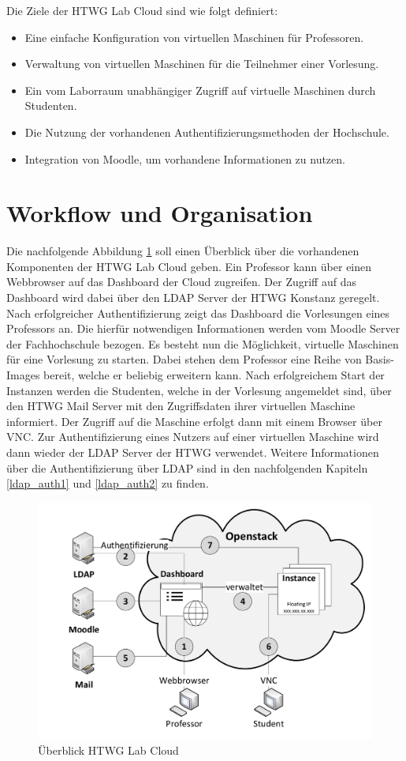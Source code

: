 Die Ziele der HTWG Lab Cloud sind wie folgt definiert:
\begin{itemize}
\item Eine einfache Konfiguration von virtuellen Maschinen für Professoren.
\item Verwaltung von virtuellen Maschinen für die Teilnehmer einer Vorlesung.
\item Ein vom Laborraum unabhängiger Zugriff auf virtuelle Maschinen durch Studenten.
\item Die Nutzung der vorhandenen Authentifizierungsmethoden der Hochschule.
\item Integration von Moodle, um vorhandene Informationen zu nutzen.
\end{itemize}

\section{Workflow und Organisation}
Die nachfolgende Abbildung \ref{overview} soll einen Überblick über 
die vorhandenen Komponenten der HTWG Lab Cloud geben.
Ein Professor kann über einen
Webbrowser auf das Dashboard der Cloud zugreifen. Der Zugriff auf das Dashboard wird dabei
über den LDAP Server der HTWG Konstanz geregelt. Nach erfolgreicher Authentifizierung 
zeigt das Dashboard die Vorlesungen eines Professors an. Die hierfür notwendigen Informationen
werden vom Moodle Server der Fachhochschule bezogen. 
Es besteht nun die Möglichkeit, virtuelle Maschinen für eine Vorlesung zu starten.
Dabei stehen dem Professor eine Reihe von Basis-Images bereit, welche er beliebig erweitern kann.
Nach erfolgreichem Start der Instanzen werden die
Studenten, welche in der Vorlesung angemeldet sind, über den HTWG Mail Server mit den
Zugriffsdaten ihrer virtuellen Maschine informiert. Der Zugriff auf die Maschine erfolgt dann mit
einem Browser über VNC. Zur Authentifizierung eines Nutzers auf einer virtuellen Maschine wird
dann wieder der LDAP Server der HTWG verwendet.
Weitere Informationen über die Authentifizierung über LDAP sind in den nachfolgenden
Kapiteln \ref{ldap_auth1} und \ref{ldap_auth2} zu finden.


\begin{figure}[H]
	\centering
	\includegraphics[scale=0.5]{img/overview.pdf}
\caption{Überblick HTWG Lab Cloud}
\label{overview}
\FloatBarrier
\end{figure}

